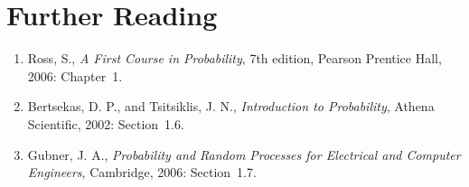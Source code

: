 \section*{Further Reading}

\begin{small}
\begin{enumerate}
\item Ross, S., \emph{A First Course in Probability}, 7th edition, Pearson Prentice Hall, 2006: Chapter~1.
\item Bertsekas, D. P., and Tsitsiklis, J. N., \emph{Introduction to Probability}, Athena Scientific, 2002: Section~1.6.
\item Gubner, J. A., \emph{Probability and Random Processes for Electrical and Computer Engineers}, Cambridge, 2006: Section~1.7.
\end{enumerate}
\end{small}

